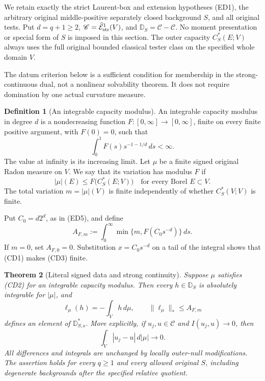 \documentclass[11pt,a4paper]{article}
\numberwithin{equation}{section}
\newtheorem{theorem}{Theorem}[section]
\theoremstyle{definition}
\newtheorem{definition}[theorem]{Definition}
\theoremstyle{remark}
\begin{document}
We retain exactly the strict Laurent-box and extension hypotheses
(ED1), the arbitrary original middle-positive separately closed
background $S$, and all original tests. Put $d=q+1\geq2$,
$\mathscr C=\widehat{\mathcal E}^{1}_{\rm str}(V)$, and
$\mathbb D_S=\mathscr C-\mathscr C$. No moment presentation or
special form of $S$ is imposed in this section. The outer capacity
$C_S^*(E;V)$ always uses the full original bounded classical tester
class on the specified whole domain $V$.

The datum criterion below is a sufficient condition for membership
in the strong-continuous dual, not a nonlinear solvability theorem.
It does not require domination by one actual curvature measure.

\begin{definition}[An integrable capacity modulus]
\label{def:r12-integrable-capacity-modulus}
An integrable capacity modulus in degree $d$ is a nondecreasing
function $F:[0,\infty]\to[0,\infty]$, finite on every finite
positive argument, with $F(0)=0$, such that
\[
                 \int_0^1 F(s)s^{-1-1/d}\,ds<\infty.
 \tag{CD1}
\]
The value at infinity is its increasing limit. Let $\mu$ be a
finite signed original Radon measure on $V$. We say that its
variation has modulus $F$ if
\[
                    |\mu|(E)\leq F\bigl(C_S^*(E;V)\bigr)
                    \quad\text{for every Borel }E\subset V.
 \tag{CD2}
\]
The total variation $m=|\mu|(V)$ is finite independently of
whether $C_S^*(V;V)$ is finite.
\end{definition}

Put $C_0=d2^d$, as in (ED5), and define
\[
       A_{F,m}:=\int_0^\infty
              \min\{m,F(C_0s^{-d})\}\,ds.
 \tag{CD3}
\]
If $m=0$, set $A_{F,0}=0$. Substitution $x=C_0s^{-d}$ on a
tail of the integral shows that (CD1) makes (CD3) finite.

\begin{theorem}[Literal signed data and strong continuity]
\label{thm:r12-capacity-modulus-strong-dual}
Suppose $\mu$ satisfies (CD2) for an integrable capacity modulus.
Then every $h\in\mathbb D_S$ is absolutely integrable for
$|\mu|$, and
\[
       \ell_\mu(h)=-\int_V h\,d\mu,
       \qquad
       \|\ell_\mu\|_*\leq A_{F,m}
 \tag{CD4}
\]
defines an element of $\mathbb D_{S,\mathrm s}^*$.
More explicitly, if $u_j,u\in\mathscr C$ and $I(u_j,u)\to0$,
then
\[
                    \int_V|u_j-u|\,d|\mu|\longrightarrow0.
 \tag{CD5}
\]
All differences and integrals are unchanged by locally outer-null
modifications. The assertion holds for every $q\geq1$ and every
allowed original $S$, including degenerate backgrounds after the
specified relative quotient.
\end{theorem}
\end{document}
